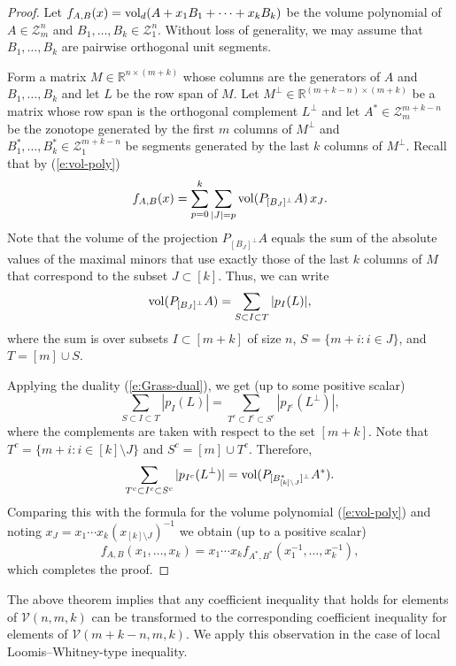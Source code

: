 \documentclass[11pt]{amsart}
\newcommand{\R}{\mathbb R}
\newcommand{\cV}{\mathcal V}
\newcommand{\Z}{\mathcal Z}
\def\vol{{\rm vol}}
\theoremstyle{definition}
\theoremstyle{remark}
\begin{document}
\begin{proof} 
Let $f_{A,B}(x)=\vol_d(A+x_1B_1+\dots+x_kB_k)$ be the volume polynomial of $A\in\Z_m^n$ and $B_1,\dots, B_k\in\Z_1^n$. Without loss of generality, we may assume that $B_1,\dots, B_k$ are pairwise orthogonal unit segments.

Form a matrix $M\in\R^{n\times (m+k)}$ whose columns are the generators of $A$ and $B_1,\dots, B_k$ and let $L$ be the row span of $M$. Let $M^\perp\in\R^{(m+k-n)\times(m+k)}$ be a matrix whose row span is the orthogonal complement $L^\perp$ and let $A^*\in\Z_m^{m+k-n}$ be the zonotope generated by the first $m$ columns of $M^\perp$ and $B^*_1,\dots, B^*_k\in\Z_1^{m+k-n}$ be segments generated by the last $k$ columns of $M^\perp$. Recall that by (\ref{e:vol-poly})
$$
f_{A,B}(x)=\sum_{p=0}^k\sum_{|J|=p}\vol(P_{[B_{J}]^\perp}A)\,x_{J}.
$$
Note that the volume of the projection $P_{[B_{J}]^\perp}A$ equals the sum of the absolute values of the maximal minors that use exactly those of the last $k$ columns of $M$ that correspond to the subset $J\subset[k]$. Thus, we can write
$$
\vol(P_{[B_{J}]^\perp}A) = \sum_{S\subset I\subset T}|p_I(L)|,
$$ 
where the sum is over subsets $I\subset[m+k]$ of size $n$, $S=\{m+i : i\in J\}$, and $T=[m]\cup S$.

Applying the duality (\ref{e:Grass-dual}), we get (up to some positive scalar)
$$
\sum_{S\subset I\subset T}|p_I(L)| = \sum_{T^c\subset I^c\subset S^c}|p_{I^c}(L^\perp)|,
$$
where the complements are taken with respect to the set $[m+k]$. Note that $T^c=\{m+i : i\in [k]\setminus J\}$ and $S^c=[m]\cup T^c$.
Therefore, 
$$
\sum_{T^c\subset I^c\subset S^c}|p_{I^c}(L^\perp)|=\vol(P_{[B^*_{[k]\setminus J}]^\perp}A^*).
$$
Comparing this with the formula for the volume polynomial (\ref{e:vol-poly}) and noting $x_J=x_1\cdots x_k(x_{[k]\setminus J})^{-1}$ we obtain (up to a positive scalar)
$$f_{A,B}(x_1,\dots, x_k)=x_1\cdots x_k f_{A^*,B^*}(x_1^{-1},\dots, x_k^{-1}),$$
which completes the proof.
\end{proof}

The above theorem implies that any coefficient inequality that holds for elements of $\cV(n,m,k)$ can be transformed to the corresponding coefficient inequality for elements of $\cV(m+k-n,m,k)$. We apply this observation in the case of local Loomis--Whitney-type inequality.
\end{document}
